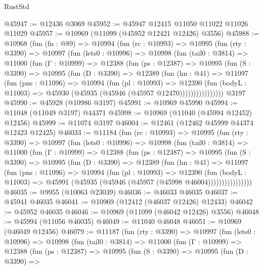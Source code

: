 \begin{lexlean}{RustStd}
\begin{coremodule}
@45947 := @12436 @3069
@45952 := @45947 @12415 @11050 @11022 @11026 @11029
@45957 := @10969 (@11099 (@45952 @12421 @12426) @3556)
@45988 := @10968
    (fun (fn : @89) =>
    @10994
      (fun (rc : @10993) =>
      @10995
        (fun (rty : @3390) =>
        @10997
          (fun (lets0 : @10996) =>
          @10998
            (fun (tail0 : @3814) =>
            @11000
              (fun (Γ : @10999) =>
              @12388
                (fun (ps : @12387) =>
                @10995
                  (fun (S : @3390) =>
                  @10995
                    (fun (D : @3390) =>
                    @12389
                      (fun (hn : @41) =>
                      @11097
                        (fun (pns : @11096) =>
                        @10994
                          (fun (pl : @10993) =>
                          @12390
                            (fun (bodyL : @11003) =>
                            @45930 (@45935 (@45946 (@45957 @12470))))))))))))))))
    @3197
@45990 := @45928 (@10986 @3197)
@45991 := @10969 @45990
@45994 := @11048 (@11049 @3197) @44371
@45998 := @10969 (@11040 (@45994 @12452) @12456)
@45999 := @11074 @3197
@46004 := @12461 (@12462 @45999 @44374 @12423 @12425)
@46033 := @11184
    (fun (rc : @10993) =>
    @10995
      (fun (rty : @3390) =>
      @10997
        (fun (lets0 : @10996) =>
        @10998
          (fun (tail0 : @3814) =>
          @11000
            (fun (Γ : @10999) =>
            @12388
              (fun (ps : @12387) =>
              @10995
                (fun (S : @3390) =>
                @10995
                  (fun (D : @3390) =>
                  @12389
                    (fun (hn : @41) =>
                    @11097
                      (fun (pns : @11096) =>
                      @10994
                        (fun (pl : @10993) =>
                        @12390
                          (fun (bodyL : @11003) =>
                          @45991 (@45935 (@45946 (@45957 (@45998 @46004))))))))))))))))
@46035 := @9955 (@10063 @23039)
@46036 := @46033 @46035
@46037 := @45941 @46035
@46041 := @10969 (@12412 (@46037 @12426) @12433)
@46042 := @45952 @46035
@46046 := @10969 (@11099 (@46042 @12426) @3556)
@46048 := @45994 (@11056 @46035)
@46049 := @11040 @46048
@46051 := @10969 (@46049 @12456)
@46079 := @11187
    (fun (rty : @3390) =>
    @10997
      (fun (lets0 : @10996) =>
      @10998
        (fun (tail0 : @3814) =>
        @11000
          (fun (Γ : @10999) =>
          @12388
            (fun (ps : @12387) =>
            @10995
              (fun (S : @3390) =>
              @10995
                (fun (D : @3390) =>

\end{coremodule}
\end{lexlean}
